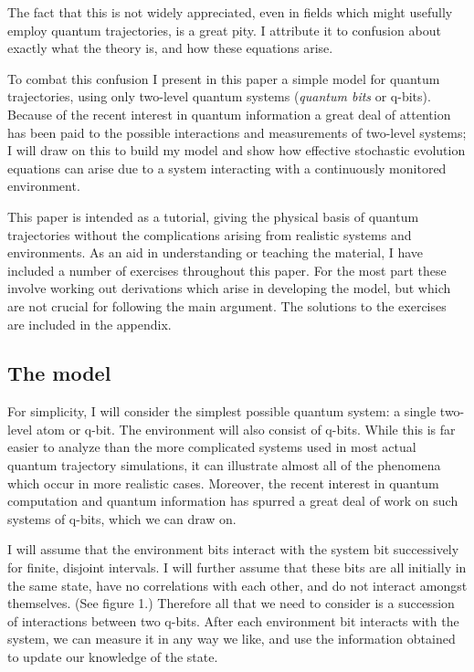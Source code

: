 \documentclass[12pt]{article}
\begin{document}
The fact that this is not widely appreciated, even in fields which might
usefully employ quantum trajectories, is a great pity.  I attribute it
to confusion about exactly what the theory is, and how these equations
arise.

To combat this confusion I present in this paper a simple model for
quantum trajectories, using only two-level quantum systems ({\it quantum bits}
or q-bits).  Because of the recent interest in quantum information
a great deal of attention has been paid to the possible interactions
and measurements of two-level systems; I will draw on this to build my
model and show how effective stochastic evolution equations can arise
due to a system interacting with a continuously monitored environment.

This paper is intended as a tutorial, giving the physical basis of
quantum trajectories without the complications arising from realistic
systems and environments.  As an aid in understanding or teaching the
material, I have included a number of exercises throughout this paper.
For the most part these involve working out derivations which arise in
developing the model, but which are not crucial for following the main
argument.  The solutions to the exercises are included in the appendix.

\subsection{The model}

For simplicity, I will consider the simplest possible quantum system:
a single two-level atom or q-bit.  The environment will also consist of 
q-bits.  While this is far easier to analyze
than the more complicated systems used in most actual quantum trajectory
simulations, it can illustrate almost all of the phenomena which occur
in more realistic cases.  Moreover, the recent interest in
quantum computation and quantum information has spurred a great deal of
work on such systems of q-bits, which we can draw on.

I will assume that the environment bits interact
with the system bit successively for finite, disjoint intervals.
I will further assume that these bits
are all initially in the same state, have no correlations with each other,
and do not interact amongst themselves.  (See figure 1.)  Therefore all
that we need to consider is a succession of interactions between two q-bits.
After each environment bit interacts with the system, we can measure it
in any way we like, and use the information obtained to update our
knowledge of the state.
\end{document}
